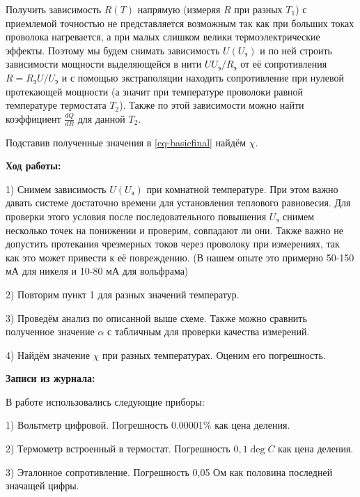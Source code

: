 \documentclass[a4paper,12pt]{article}
\begin{document}
Получить зависимость $R(T)$ напрямую (измеряя $R$ при разных $T_1$) с приемлемой точностью не представляется возможным так как при больших токах проволока нагревается, а при малых слишком велики термоэлектрические эффекты. Поэтому мы будем снимать зависимость $U(U_\text{э})$ и по ней строить зависимости мощности выделяющейся в нити $UU_\text{э}/R_\text{э}$ от её сопротивления $R = R_\text{э} U/U_\text{э}$ и с помощью экстраполяции находить сопротивление при нулевой протекающей мощности (а значит при температуре проволоки равной температуре термостата $T_2$). Также по этой зависимости можно найти коэффициент $\frac{dQ}{dR}$ для данной $T_2$.

Подставив полученные значения в \ref{eq-basicfinal} найдём $\chi$.

\bigskip

\textbf{Ход работы:}
\bigskip

1) Снимем зависимость $U(U_\text{э})$ при комнатной температуре. При этом важно давать системе достаточно времени для установления теплового равновесия. Для проверки этого условия после последовательного повышения $U_\text{э}$ снимем несколько точек на понижении и проверим, совпадают ли они. Также важно не допустить протекания чрезмерных токов через проволоку при измерениях, так как это может привести к её повреждению. (В нашем опыте это примерно 50-150 мА для никеля и 10-80 мА для вольфрама)

2) Повторим пункт 1 для разных значений температур.

3) Проведём анализ по описанной выше схеме. Также можно сравнить полученное значение $\alpha$ с табличным для проверки качества измерений.

4) Найдём значение $\chi$ при разных температурах. Оценим его погрешность.


\bigskip

\textbf{Записи из журнала:}
\bigskip

В работе использовались следующие приборы:

1) Вольтметр цифровой. Погрешность 0.00001\% как цена деления.

2) Термометр встроенный в термостат. Погрешность $0,1\deg C$ как цена деления.

3) Эталонное сопротивление. Погрешность 0,05 Ом как половина последней значащей цифры.
\end{document}
